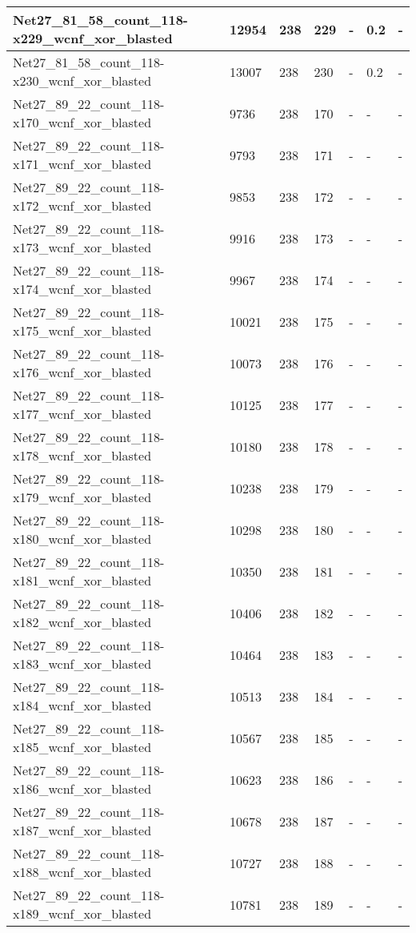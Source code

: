 \begin{scriptsize}
\begin{longtable}{|p{5cm}|l|l|l|l|l|l|}
Net27\_81\_58\_count\_118-x229\_wcnf\_xor\_blasted&12954&238&229&-&0.2&- \\ \hline 
Net27\_81\_58\_count\_118-x230\_wcnf\_xor\_blasted&13007&238&230&-&0.2&- \\ \hline 
Net27\_89\_22\_count\_118-x170\_wcnf\_xor\_blasted&9736&238&170&-&-&- \\ \hline 
Net27\_89\_22\_count\_118-x171\_wcnf\_xor\_blasted&9793&238&171&-&-&- \\ \hline 
Net27\_89\_22\_count\_118-x172\_wcnf\_xor\_blasted&9853&238&172&-&-&- \\ \hline 
Net27\_89\_22\_count\_118-x173\_wcnf\_xor\_blasted&9916&238&173&-&-&- \\ \hline 
Net27\_89\_22\_count\_118-x174\_wcnf\_xor\_blasted&9967&238&174&-&-&- \\ \hline 
Net27\_89\_22\_count\_118-x175\_wcnf\_xor\_blasted&10021&238&175&-&-&- \\ \hline 
Net27\_89\_22\_count\_118-x176\_wcnf\_xor\_blasted&10073&238&176&-&-&- \\ \hline 
Net27\_89\_22\_count\_118-x177\_wcnf\_xor\_blasted&10125&238&177&-&-&- \\ \hline 
Net27\_89\_22\_count\_118-x178\_wcnf\_xor\_blasted&10180&238&178&-&-&- \\ \hline 
Net27\_89\_22\_count\_118-x179\_wcnf\_xor\_blasted&10238&238&179&-&-&- \\ \hline 
Net27\_89\_22\_count\_118-x180\_wcnf\_xor\_blasted&10298&238&180&-&-&- \\ \hline 
Net27\_89\_22\_count\_118-x181\_wcnf\_xor\_blasted&10350&238&181&-&-&- \\ \hline 
Net27\_89\_22\_count\_118-x182\_wcnf\_xor\_blasted&10406&238&182&-&-&- \\ \hline 
Net27\_89\_22\_count\_118-x183\_wcnf\_xor\_blasted&10464&238&183&-&-&- \\ \hline 
Net27\_89\_22\_count\_118-x184\_wcnf\_xor\_blasted&10513&238&184&-&-&- \\ \hline 
Net27\_89\_22\_count\_118-x185\_wcnf\_xor\_blasted&10567&238&185&-&-&- \\ \hline 
Net27\_89\_22\_count\_118-x186\_wcnf\_xor\_blasted&10623&238&186&-&-&- \\ \hline 
Net27\_89\_22\_count\_118-x187\_wcnf\_xor\_blasted&10678&238&187&-&-&- \\ \hline 
Net27\_89\_22\_count\_118-x188\_wcnf\_xor\_blasted&10727&238&188&-&-&- \\ \hline 
Net27\_89\_22\_count\_118-x189\_wcnf\_xor\_blasted&10781&238&189&-&-&- \\ \hline 

\end{longtable}
\end{scriptsize}
